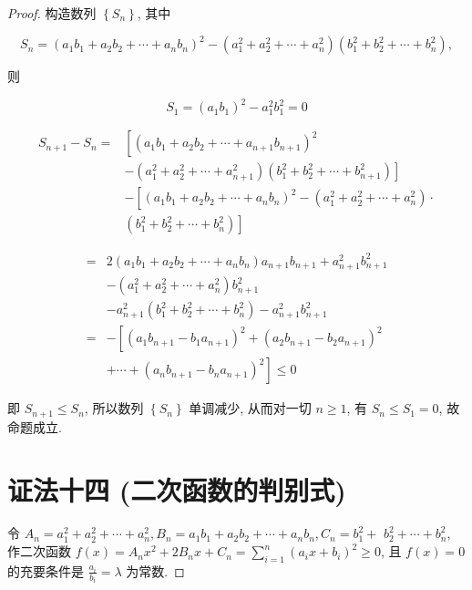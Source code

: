 \begin{proof}
	构造数列 $\left\{S_{n}\right\}$, 其中
	
	$$
	S_{n}=\left(a_{1} b_{1}+a_{2} b_{2}+\cdots+a_{n} b_{n}\right)^{2}-\left(a_{1}^{2}+a_{2}^{2}+\cdots+a_{n}^{2}\right)\left(b_{1}^{2}+b_{2}^{2}+\cdots+b_{n}^{2}\right),
	$$
	
	则
	
	$$
	S_{1}=\left(a_{1} b_{1}\right)^{2}-a_{1}^{2} b_{1}^{2}=0
	$$
	
	$$
	\begin{aligned}
	S_{n+1}-S_{n}= & {\left[\left(a_{1} b_{1}+a_{2} b_{2}+\cdots+a_{n+1} b_{n+1}\right)^{2}\right.} \\
	& \left.-\left(a_{1}^{2}+a_{2}^{2}+\cdots+a_{n+1}^{2}\right)\left(b_{1}^{2}+b_{2}^{2}+\cdots+b_{n+1}^{2}\right)\right] \\
	& -\left[\left(a_{1} b_{1}+a_{2} b_{2}+\cdots+a_{n} b_{n}\right)^{2}-\left(a_{1}^{2}+a_{2}^{2}+\cdots+a_{n}^{2}\right) \cdot\right. \\
	& \left.\left(b_{1}^{2}+b_{2}^{2}+\cdots+b_{n}^{2}\right)\right]
	\end{aligned}
	$$
	
	$$
	\begin{aligned}
	= & 2\left(a_{1} b_{1}+a_{2} b_{2}+\cdots+a_{n} b_{n}\right) a_{n+1} b_{n+1}+a_{n+1}^{2} b_{n+1}^{2} \\
	& -\left(a_{1}^{2}+a_{2}^{2}+\cdots+a_{n}^{2}\right) b_{n+1}^{2} \\
	& -a_{n+1}^{2}\left(b_{1}^{2}+b_{2}^{2}+\cdots+b_{n}^{2}\right)-a_{n+1}^{2} b_{n+1}^{2} \\
	= & -\left[\left(a_{1} b_{n+1}-b_{1} a_{n+1}\right)^{2}+\left(a_{2} b_{n+1}-b_{2} a_{n+1}\right)^{2}\right. \\
	& \left.+\cdots+\left(a_{n} b_{n+1}-b_{n} a_{n+1}\right)^{2}\right] \leqslant 0
	\end{aligned}
	$$
	
	即 $S_{n+1} \leqslant S_{n}$, 所以数列 $\left\{S_{n}\right\}$ 单调减少, 从而对一切 $n \geqslant 1$, 有 $S_{n} \leqslant S_{1}=0$, 故命题成立.
	
	\section*{证法十四 (二次函数的判别式)}
	令 $A_{n}=a_{1}^{2}+a_{2}^{2}+\cdots+a_{n}^{2}, B_{n}=a_{1} b_{1}+a_{2} b_{2}+\cdots+a_{n} b_{n}, C_{n}=b_{1}^{2}+$ $b_{2}^{2}+\cdots+b_{n}^{2}$, 作二次函数 $f(x)=A_{n} x^{2}+2 B_{n} x+C_{n}=\sum_{i=1}^{n}\left(a_{i} x+b_{i}\right)^{2} \geqslant 0$, 且 $f(x)=0$ 的充要条件是 $\frac{a_{i}}{b_{i}}=\lambda$ 为常数.
	

\end{proof}
